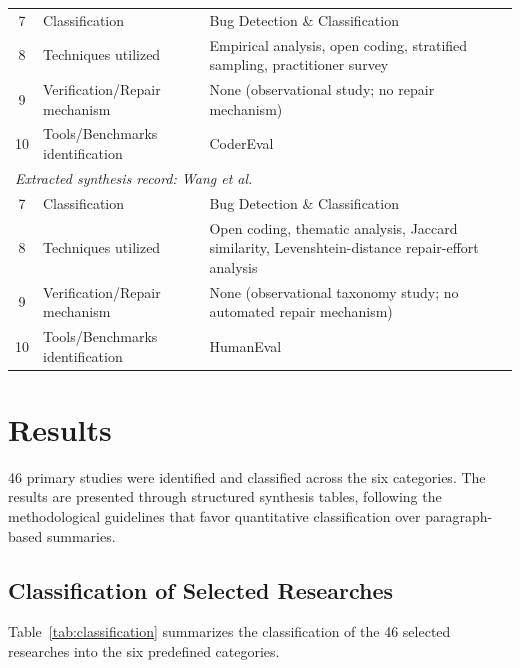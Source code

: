 \documentclass[10pt,a4paper]{article}
\begin{document}
\begin{table}[!t]
\begin{tabular}{@{}cp{4cm}p{9cm}@{}}
\midrule
7 & Classification & Bug Detection \& Classification \\
8 & Techniques utilized & Empirical analysis, open coding, stratified sampling, practitioner survey \\
9 & Verification/Repair mechanism & None (observational study; no repair mechanism) \\
10 & Tools/Benchmarks identification & CoderEval \\
\midrule
\multicolumn{3}{l}{\textit{Extracted synthesis record: Wang et al.~\cite{wang2025where}}} \\
\midrule
7 & Classification & Bug Detection \& Classification \\
8 & Techniques utilized & Open coding, thematic analysis, Jaccard similarity, Levenshtein-distance repair-effort analysis \\
9 & Verification/Repair mechanism & None (observational taxonomy study; no automated repair mechanism) \\
10 & Tools/Benchmarks identification & HumanEval \\
\bottomrule
\end{tabular}
\end{table}

\section{Results}
\label{sec:results}
46 primary studies were identified and classified across the six categories. The results are presented through structured synthesis tables, following the methodological guidelines that favor quantitative classification over paragraph-based summaries.

\subsection{Classification of Selected Researches}
\label{sec:classification}
Table~\ref{tab:classification} summarizes the classification of the 46 selected researches into the six predefined categories.
\end{document}
